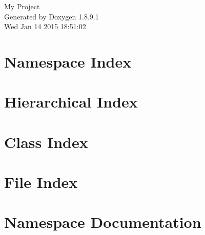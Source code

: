 \documentclass[twoside]{book}
\newcommand{\+}{\discretionary{\mbox{\scriptsize$\hookleftarrow$}}{}{}}
\newcommand{\clearemptydoublepage}{%
  \newpage{\pagestyle{empty}\cleardoublepage}%
}
\begin{document}
\hypersetup{pageanchor=false,
             bookmarks=true,
             bookmarksnumbered=true,
             pdfencoding=unicode
            }
\begin{titlepage}
\vspace*{7cm}
\begin{center}%
{\Large My Project }\\
\vspace*{1cm}
{\large Generated by Doxygen 1.8.9.1}\\
\vspace*{0.5cm}
{\small Wed Jan 14 2015 18:51:02}\\
\end{center}
\end{titlepage}
\clearemptydoublepage
\tableofcontents
\clearemptydoublepage
{}
\hypersetup{pageanchor=true}

\chapter{Namespace Index}

\chapter{Hierarchical Index}

\chapter{Class Index}

\chapter{File Index}

\chapter{Namespace Documentation}








\end{document}
